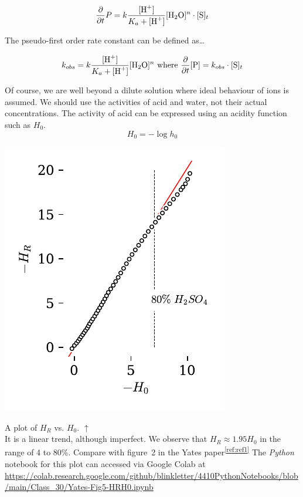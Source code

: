 \documentclass[]{tufte-handout}
\begin{document}
\begin{equation}
   \frac{\partial}{\partial t} P =  k\frac{[\ce{H+}]}{K_a + [\ce{H+}]}[\ce{H2O}]^n \cdot [\ce{S}]_t
  \label{eq:1}
\end{equation}

The pseudo-first order rate constant can be defined as\ldots

\begin{equation}
   k_{obs} =  k\frac{[\ce{H+}]}{K_a + [\ce{H+}]}[\ce{H2O}]^n \textrm{ where } \frac{\partial}{\partial t} [\ce{P}] =  k_{obs}\cdot [\ce{S}]_t
  \label{eq:2}
\end{equation}

Of course, we are well beyond a dilute solution where ideal behaviour of ions is assumed. We should use the activities of acid and water, not their actual concentrations. The activity of acid can be expressed using an acidity function such as $H_0$. 
\begin{equation}
   H_0 = -\log{h_0}
  \label{eq:3}
\end{equation}

\vspace{0mm}

\begin{marginfigure}[-5mm]
  \centering
  \includegraphics[scale=0.7]{images/H0HrCorrelation}
  \caption{A plot of $H_R$ vs. $H_0$. $\uparrow$ \\ \vspace{1mm} It is a linear trend, although imperfect. We observe that $H_R \approx 1.95H_0$ in the range of 4 to 80\%. Compare with figure~2 in the Yates paper\textsuperscript{\ref{ref:ref1}} The \textit{Python} notebook for this plot can accessed via Google Colab at \url{https://colab.research.google.com/github/blinkletter/4410PythonNotebooks/blob/main/Class_30/Yates-Fig5-HRH0.ipynb}\vspace{5mm}} 
  \label{fig:fig5}
\end{marginfigure}
\end{document}
